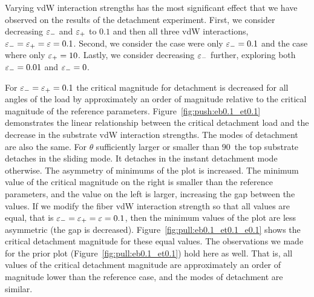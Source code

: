 Varying vdW interaction strengths has the most significant effect that we have observed on the results of the detachment experiment. First, we consider decreasing $\varepsilon_-$ and $\varepsilon_+$ to $0.1$ and then all three vdW interactions, $\varepsilon_- = \varepsilon_+ = \varepsilon = 0.1$. Second, we consider the case were only $\varepsilon_-=0.1$ and the case where only $\varepsilon_+=10$. Lastly, we consider decreasing $\varepsilon_-$ further, exploring both $\varepsilon_-=0.01$ and $\varepsilon_-=0$.

For $\varepsilon_- = \varepsilon_+ = 0.1$ the critical magnitude for detachment is decreased for all angles of the load by approximately an order of magnitude relative to the critical magnitude of the reference parameters. Figure~\ref{fig:push:eb0.1_et0.1} demonstrates the linear relationship between the critical detachment load and the decrease in the substrate vdW interaction strengths. The modes of detachment are also the same. For $\theta$ sufficiently larger or smaller than $90$\textdegree\ the top substrate detaches in the sliding mode. It detaches in the instant detachment mode otherwise. The asymmetry of minimums of the plot is increased. The minimum value of the critical magnitude on the right is smaller than the reference parameters, and the  value on the left is larger, increasing the gap between the values. If we modify the fiber vdW interaction strength so that all values are equal, that is $\varepsilon_- = \varepsilon_+ = \varepsilon = 0.1$, then the minimum values of the plot are less asymmetric (the gap is decreased). Figure~\ref{fig:pull:eb0.1_et0.1_e0.1} shows the critical detachment magnitude for these equal values. The observations we made for the prior plot (Figure~\ref{fig:pull:eb0.1_et0.1}) hold here as well. That is, all values of the critical detachment magnitude are approximately an order of magnitude lower than the reference case, and the modes of detachment are similar.

